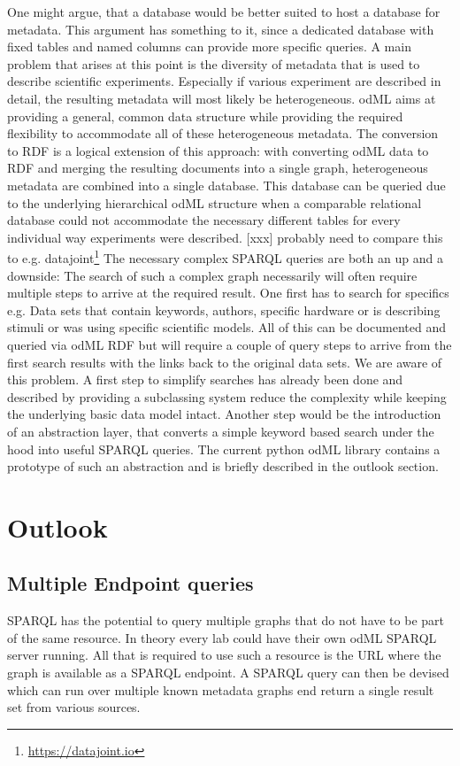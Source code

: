 \documentclass{article}
\begin{document}
One might argue, that a database would be better suited to host a database for metadata. This argument has something to it, since a dedicated database with fixed tables and named columns can provide more specific queries.
A main problem that arises at this point is the diversity of metadata that is used to describe scientific experiments. Especially if various experiment are described in detail, the resulting metadata will most likely be heterogeneous. odML aims at providing a general, common data structure while providing the required flexibility to accommodate all of these heterogeneous metadata. The conversion to RDF is a logical extension of this approach: with converting odML data to RDF and merging the resulting documents into a single graph, heterogeneous metadata are combined into a single database. This database can be queried due to the underlying hierarchical odML structure when a comparable relational database could not accommodate the necessary different tables for every individual way experiments were described. [xxx] probably need to compare this to e.g. datajoint\footnote{\url{https://datajoint.io}}
The necessary complex SPARQL queries are both an up and a downside: The search of such a complex graph necessarily will often require multiple steps to arrive at the required result. One first has to search for specifics e.g. Data sets that contain keywords, authors, specific hardware or is describing stimuli or was using specific scientific models. All of this can be documented and queried via odML RDF but will require a couple of query steps to arrive from the first search results with the links back to the original data sets.
We are aware of this problem. A first step to simplify searches has already been done and described by providing a subclassing system reduce the complexity while keeping the underlying basic data model intact. Another step would be the introduction of an abstraction layer, that converts a simple keyword based search under the hood into useful SPARQL queries. The current python odML library contains a prototype of such an abstraction and is briefly described in the outlook section.

\section{Outlook} \label{sec:outlook}
\subsection{Multiple Endpoint queries} \label{sec:outlook_endpoints}
SPARQL has the potential to query multiple graphs that do not have to be part of the same resource. In theory every lab could have their own odML SPARQL server running. All that is required to use such a resource is the URL where the graph is available as a SPARQL endpoint. A SPARQL query can then be devised which can run over multiple known metadata graphs end return a single result set from various sources.
\end{document}
